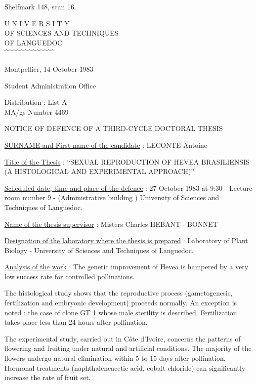 Shelfmark 148, scan 16.


\begin{center}
U N I V E R S I T Y\\
OF SCIENCES AND TECHNIQUES\\
OF LANGUEDOC\\
\textasciicircum\textasciicircum\textasciicircum\textasciicircum\textasciicircum\textasciicircum\textasciicircum\textasciicircum\textasciicircum\textasciicircum\textasciicircum\textasciicircum\textasciicircum
\end{center}

Montpellier, 14 October 1983

Student Administration Office

Distribution : List A\\
MA/gs \hfill Number 4469

\begin{center}
NOTICE OF DEFENCE OF A THIRD-CYCLE DOCTORAL THESIS

\end{center}

\uline{SURNAME and First name of the candidate} : LECONTE Antoine

\uline{Title of the Thesis} : ``SEXUAL REPRODUCTION OF HEVEA BRASILIENSIS (A HISTOLOGICAL AND EXPERIMENTAL APPROACH)''

\uline{Scheduled date, time and place of the defence} : 27 October 1983 at 9:30 - Lecture room number 9 - (Administrative building ) University of Sciences and Techniques of Languedoc.

\uline{Name of the thesis supervisor} : Misters Charles HEBANT - BONNET

\uline{Designation of the laboratory where the thesis is prepared} : Laboratory of Plant Biology - University of Sciences and Techniques of Languedoc.

\uline{Analysis of the work} : The genetic improvement of Hevea is hampered by a very low success rate for controlled pollinations.

The histological study shows that the reproductive process (gametogenesis, fertilization and embryonic development) proceeds normally. An exception is noted : the case of clone GT 1 whose male sterility is described. Fertilization takes place less than 24 hours after pollination.

The experimental study, carried out in Côte d'Ivoire, concerns the patterns of flowering and fruiting under natural and artificial conditions. The majority of the flowers undergo natural elimination within 5 to 15 days after pollination. Hormonal treatments (naphthaleneacetic acid, cobalt chloride) can significantly increase the rate of fruit set.


